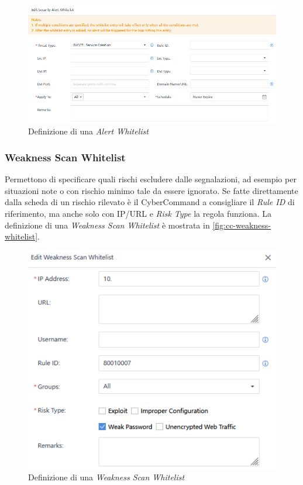 \begin{figure}[!htbp]
    \centering
    \includegraphics[width=0.8\linewidth]{images/ndr/alert-whitelist.png}
    \caption{Definizione di una \emph{Alert Whitelist}}
    \label{fig:cc-alert-whitelist}
\end{figure}

\subsubsection{Weakness Scan Whitelist}

Permettono di specificare quali rischi escludere dalle segnalazioni, ad esempio per situazioni note o con rischio minimo tale da essere ignorato. Se fatte direttamente dalla scheda di un rischio rilevato è il CyberCommand a consigliare il \emph{Rule ID} di riferimento, ma anche solo con IP/URL e \emph{Risk Type} la regola funziona. La definizione di una \emph{Weakness Scan Whitelist} è mostrata in \autoref{fig:cc-weakness-whitelist}.

\begin{figure}[!htbp]
    \centering
    \includegraphics[scale=0.7]{images/ndr/weakness-whitelist.png}
    \caption{Definizione di una \emph{Weakness Scan Whitelist}}
    \label{fig:cc-weakness-whitelist}
\end{figure}

